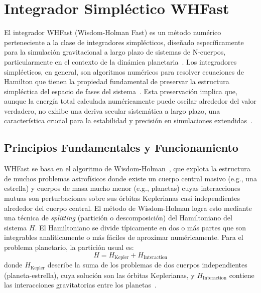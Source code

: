 \section{Integrador Simpléctico WHFast} %

El integrador WHFast (Wisdom-Holman Fast) es un método numérico perteneciente a la clase de integradores simplécticos, diseñado específicamente para la simulación gravitacional a largo plazo de sistemas de N-cuerpos, particularmente en el contexto de la dinámica planetaria~\cite{ReinTamayo2015}. Los integradores simplécticos, en general, son algoritmos numéricos para resolver ecuaciones de Hamilton que tienen la propiedad fundamental de preservar la estructura simpléctica del espacio de fases del sistema~\cite{Hairer2006}. Esta preservación implica que, aunque la energía total calculada numéricamente puede oscilar alrededor del valor verdadero, no exhibe una deriva secular sistemática a largo plazo, una característica crucial para la estabilidad y precisión en simulaciones extendidas~\cite{ReinTamayo2015, Hairer2006}.

\subsection{Principios Fundamentales y Funcionamiento}

WHFast se basa en el algoritmo de Wisdom-Holman~\cite{wisdom1991}, que explota la estructura de muchos problemas astrofísicos donde existe un cuerpo central masivo (e.g., una estrella) y cuerpos de masa mucho menor (e.g., planetas) cuyas interacciones mutuas son perturbaciones sobre sus órbitas Keplerianas casi independientes alrededor del cuerpo central. El método de Wisdom-Holman logra esto mediante una técnica de \textit{splitting} (partición o descomposición) del Hamiltoniano del sistema \(H\). El Hamiltoniano se divide típicamente en dos o más partes que son integrables analíticamente o más fáciles de aproximar numéricamente. Para el problema planetario, la partición usual es:
\begin{equation}
H = H_{\text{Kepler}} + H_{\text{Interaction}}
\end{equation}
donde \(H_{\text{Kepler}}\) describe la suma de los problemas de dos cuerpos independientes (planeta-estrella), cuya solución son las órbitas Keplerianas, y \(H_{\text{Interaction}}\) contiene las interacciones gravitatorias entre los planetas~\cite{ReinTamayo2015, wisdom1991}.

